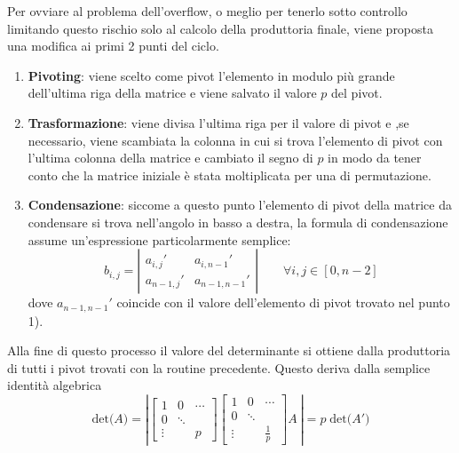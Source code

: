 \documentclass{article}
\begin{document}
Per ovviare al problema dell'overflow, o meglio per tenerlo sotto controllo limitando questo rischio solo al calcolo della produttoria finale, viene proposta una modifica ai primi 2 punti del ciclo.

\begin{enumerate}
\item \textbf{Pivoting}: viene scelto come pivot l'elemento in modulo più grande dell'ultima riga della matrice e viene salvato il valore $p$ del pivot.
\item \textbf{Trasformazione}: viene divisa l'ultima riga per il valore di pivot e ,se necessario, viene scambiata la colonna in cui si trova l'elemento di pivot con l'ultima colonna della matrice e cambiato il segno di $p$ in modo da tener conto che la matrice iniziale è stata moltiplicata per una di permutazione.
\item \textbf{Condensazione}: siccome a questo punto l'elemento di pivot della matrice da condensare si trova nell'angolo in basso a destra, la formula di condensazione assume un'espressione particolarmente semplice:
\begin{equation}\label{eq:CondMia}
b_{i,j} =
\left| \begin{array}{cc} a_{i,j}' & a_{i , n-1}'  \\ a_{n-1 , j}' & a_{n-1,n-1}'  \end{array} \right|  \qquad \forall i,j \in [0, n-2]
\end{equation}
dove $a_{n-1,n-1}' $ coincide con il valore dell'elemento di pivot trovato nel punto 1).

\end{enumerate}
Alla fine di questo processo il valore del determinante si ottiene dalla produttoria di tutti i pivot trovati con la routine precedente.
Questo deriva dalla semplice identità algebrica
\begin{displaymath}
	\mbox{det}\big(A\big) = \left| 
		\left[ \begin{array}{ccc}
			1 & 0 & \cdots \\
			0 & \ddots & \\
			\vdots & &p
		\end{array} \right]
		\left[ \begin{array}{ccc}
			1 & 0 & \cdots \\
			0 & \ddots & \\
			\vdots & &\frac{1}{p}
		\end{array} \right]
		  A\: \right|
		 	=
	   p \;	\mbox{det}\big(A'\big)
\end{displaymath}
\end{document}
